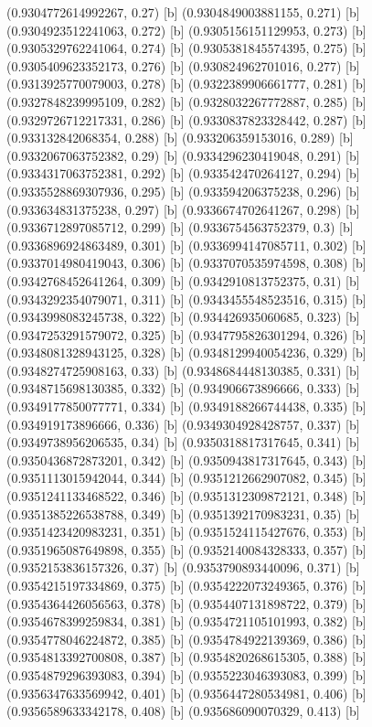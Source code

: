 {{{(0.9304772614992267, 0.27) [b] 
(0.9304849003881155, 0.271) [b] 
(0.9304923512241063, 0.272) [b] 
(0.9305156151129953, 0.273) [b] 
(0.9305329762241064, 0.274) [b] 
(0.9305381845574395, 0.275) [b] 
(0.9305409623352173, 0.276) [b] 
(0.930824962701016, 0.277) [b] 
(0.9313925770079003, 0.278) [b] 
(0.9322389906661777, 0.281) [b] 
(0.9327848239995109, 0.282) [b] 
(0.9328032267772887, 0.285) [b] 
(0.9329726712217331, 0.286) [b] 
(0.9330837823328442, 0.287) [b] 
(0.933132842068354, 0.288) [b] 
(0.933206359153016, 0.289) [b] 
(0.9332067063752382, 0.29) [b] 
(0.9334296230419048, 0.291) [b] 
(0.9334317063752381, 0.292) [b] 
(0.933542470264127, 0.294) [b] 
(0.9335528869307936, 0.295) [b] 
(0.933594206375238, 0.296) [b] 
(0.933634831375238, 0.297) [b] 
(0.9336674702641267, 0.298) [b] 
(0.9336712897085712, 0.299) [b] 
(0.9336754563752379, 0.3) [b] 
(0.9336896924863489, 0.301) [b] 
(0.9336994147085711, 0.302) [b] 
(0.9337014980419043, 0.306) [b] 
(0.9337070535974598, 0.308) [b] 
(0.9342768452641264, 0.309) [b] 
(0.9342910813752375, 0.31) [b] 
(0.9343292354079071, 0.311) [b] 
(0.9343455548523516, 0.315) [b] 
(0.9343998083245738, 0.322) [b] 
(0.934426935060685, 0.323) [b] 
(0.9347253291579072, 0.325) [b] 
(0.9347795826301294, 0.326) [b] 
(0.9348081328943125, 0.328) [b] 
(0.9348129940054236, 0.329) [b] 
(0.9348274725908163, 0.33) [b] 
(0.9348684448130385, 0.331) [b] 
(0.9348715698130385, 0.332) [b] 
(0.934906673896666, 0.333) [b] 
(0.9349177850077771, 0.334) [b] 
(0.9349188266744438, 0.335) [b] 
(0.934919173896666, 0.336) [b] 
(0.9349304928428757, 0.337) [b] 
(0.9349738956206535, 0.34) [b] 
(0.9350318817317645, 0.341) [b] 
(0.9350436872873201, 0.342) [b] 
(0.9350943817317645, 0.343) [b] 
(0.9351113015942044, 0.344) [b] 
(0.9351212662907082, 0.345) [b] 
(0.9351241133468522, 0.346) [b] 
(0.9351312309872121, 0.348) [b] 
(0.9351385226538788, 0.349) [b] 
(0.9351392170983231, 0.35) [b] 
(0.9351423420983231, 0.351) [b] 
(0.9351524115427676, 0.353) [b] 
(0.9351965087649898, 0.355) [b] 
(0.9352140084328333, 0.357) [b] 
(0.9352153836157326, 0.37) [b] 
(0.9353790893440096, 0.371) [b] 
(0.9354215197334869, 0.375) [b] 
(0.9354222073249365, 0.376) [b] 
(0.9354364426056563, 0.378) [b] 
(0.9354407131898722, 0.379) [b] 
(0.9354678399259834, 0.381) [b] 
(0.9354721105101993, 0.382) [b] 
(0.9354778046224872, 0.385) [b] 
(0.9354784922139369, 0.386) [b] 
(0.9354813392700808, 0.387) [b] 
(0.9354820268615305, 0.388) [b] 
(0.9354879296393083, 0.394) [b] 
(0.9355223046393083, 0.399) [b] 
(0.9356347633569942, 0.401) [b] 
(0.9356447280534981, 0.406) [b] 
(0.9356589633342178, 0.408) [b] 
(0.935686090070329, 0.413) [b] 
}}}
